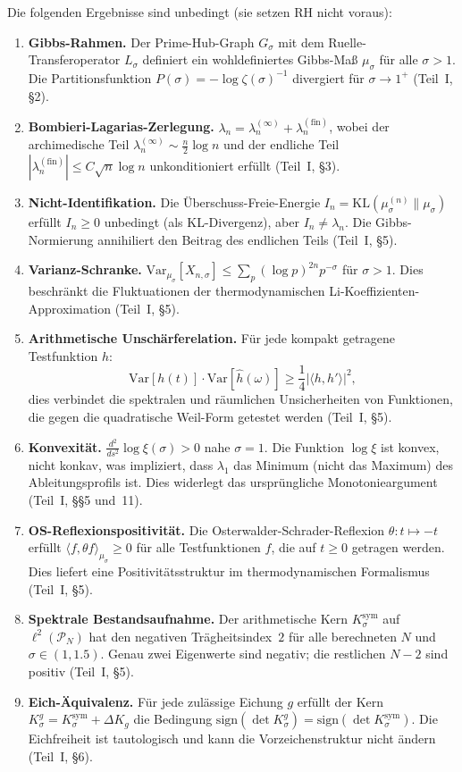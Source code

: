 \documentclass[12pt,a4paper]{article}
\theoremstyle{definition}
\theoremstyle{remark}
\newcommand{\Ksym}{K_\sigma^{\mathrm{sym}}}
\newcommand{\muG}{\mu_\sigma}
\newcommand{\PP}{\mathcal{P}}
\begin{document}
Die folgenden Ergebnisse sind unbedingt (sie setzen RH nicht voraus):
\begin{enumerate}[label=\textbf{R\arabic*},leftmargin=3em]
  \item \textbf{Gibbs-Rahmen.} Der Prime-Hub-Graph $G_\sigma$ mit dem Ruelle-Transferoperator $L_\sigma$ definiert ein wohldefiniertes Gibbs-Maß $\muG$ für alle $\sigma > 1$. Die Partitionsfunktion $P(\sigma) = -\log\zeta(\sigma)^{-1}$ divergiert für $\sigma \to 1^+$ (Teil~I, \S2).
  \item \textbf{Bombieri-Lagarias-Zerlegung.} $\lambda_n = \lambda_n^{(\infty)} + \lambda_n^{(\mathrm{fin})}$, wobei der archimedische Teil $\lambda_n^{(\infty)} \sim \frac{n}{2}\log n$ und der endliche Teil $|\lambda_n^{(\mathrm{fin})}| \leq C\sqrt{n}\log n$ unkonditioniert erfüllt (Teil~I, \S3).
  \item \textbf{Nicht-Identifikation.} Die Überschuss-Freie-Energie $I_n = \mathrm{KL}(\mu_\sigma^{(n)} \| \muG)$ erfüllt $I_n \geq 0$ unbedingt (als KL-Divergenz), aber $I_n \neq \lambda_n$. Die Gibbs-Normierung annihiliert den Beitrag des endlichen Teils (Teil~I, \S5).
  \item \textbf{Varianz-Schranke.} $\mathrm{Var}_{\muG}[X_{n,\sigma}] \leq \sum_p (\log p)^{2n}p^{-\sigma}$ für $\sigma > 1$. Dies beschränkt die Fluktuationen der thermodynamischen Li-Koeffizienten-Approximation (Teil~I, \S5).
  \item \textbf{Arithmetische Unschärferelation.} Für jede kompakt getragene Testfunktion $h$:
  \[ \mathrm{Var}[h(t)] \cdot \mathrm{Var}[\hat{h}(\omega)] \geq \frac{1}{4}\bigl|\langle h, h' \rangle\bigr|^2, \]
  dies verbindet die spektralen und räumlichen Unsicherheiten von Funktionen, die gegen die quadratische Weil-Form getestet werden (Teil~I, \S5).
  \item \textbf{Konvexität.} $\frac{d^2}{ds^2}\log\xi(\sigma) > 0$ nahe $\sigma = 1$. Die Funktion $\log\xi$ ist konvex, nicht konkav, was impliziert, dass $\lambda_1$ das Minimum (nicht das Maximum) des Ableitungsprofils ist. Dies widerlegt das ursprüngliche Monotonieargument (Teil~I, \S\S5 und~11).
  \item \textbf{OS-Reflexionspositivität.} Die Osterwalder-Schrader-Reflexion $\theta: t \mapsto -t$ erfüllt $\langle f, \theta f \rangle_{\muG} \geq 0$ für alle Testfunktionen $f$, die auf $t \geq 0$ getragen werden. Dies liefert eine Positivitätsstruktur im thermodynamischen Formalismus (Teil~I, \S5).
  \item \textbf{Spektrale Bestandsaufnahme.} Der arithmetische Kern $\Ksym$ auf $\ell^2(\PP_N)$ hat den negativen Trägheitsindex~$2$ für alle berechneten $N$ und $\sigma \in (1, 1.5)$. Genau zwei Eigenwerte sind negativ; die restlichen $N-2$ sind positiv (Teil~I, \S5).
  \item \textbf{Eich-Äquivalenz.} Für jede zulässige Eichung $g$ erfüllt der Kern $K_\sigma^g = \Ksym + \Delta K_g$ die Bedingung $\mathrm{sign}(\det K_\sigma^g) = \mathrm{sign}(\det \Ksym)$. Die Eichfreiheit ist tautologisch und kann die Vorzeichenstruktur nicht ändern (Teil~I, \S6).
\end{enumerate}
\end{document}
